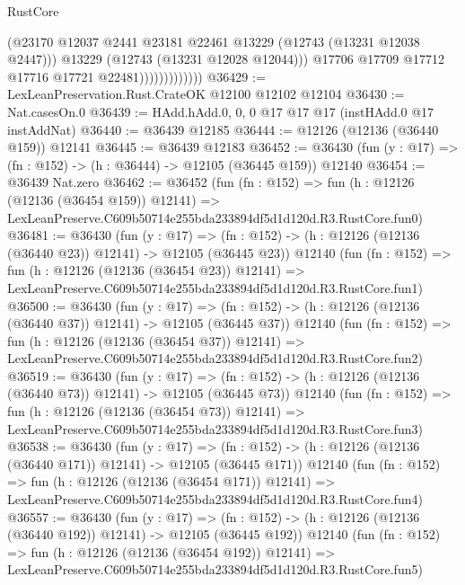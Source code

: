 \begin{lexlean}{RustCore}
\begin{coremodule}
                                (@23170
                                  @12037
                                  @2441
                                  @23181
                                  @22461
                                  @13229
                                  (@12743 (@13231 @12038 @2447)))
                                @13229
                                (@12743 (@13231 @12028 @12044)))
                              @17706
                              @17709
                              @17712
                              @17716
                              @17721
                              @22481)))))))))))))
@36429 := LexLeanPreservation.Rust.CrateOK @12100 @12102 @12104
@36430 := Nat.casesOn.{0}
@36439 := HAdd.hAdd.{0, 0, 0} @17 @17 @17 (instHAdd.{0} @17 instAddNat)
@36440 := @36439 @12185
@36444 := @12126 (@12136 (@36440 @159)) @12141
@36445 := @36439 @12183
@36452 := @36430 (fun (y : @17) => (fn : @152) -> (h : @36444) -> @12105 (@36445 @159)) @12140
@36454 := @36439 Nat.zero
@36462 := @36452
    (fun (fn : @152) =>
    fun (h : @12126 (@12136 (@36454 @159)) @12141) =>
    LexLeanPreserve.C609b50714e255bda233894df5d1d120d.R3.RustCore.fun0)
@36481 := @36430
    (fun (y : @17) =>
    (fn : @152) -> (h : @12126 (@12136 (@36440 @23)) @12141) -> @12105 (@36445 @23))
    @12140
    (fun (fn : @152) =>
    fun (h : @12126 (@12136 (@36454 @23)) @12141) =>
    LexLeanPreserve.C609b50714e255bda233894df5d1d120d.R3.RustCore.fun1)
@36500 := @36430
    (fun (y : @17) =>
    (fn : @152) -> (h : @12126 (@12136 (@36440 @37)) @12141) -> @12105 (@36445 @37))
    @12140
    (fun (fn : @152) =>
    fun (h : @12126 (@12136 (@36454 @37)) @12141) =>
    LexLeanPreserve.C609b50714e255bda233894df5d1d120d.R3.RustCore.fun2)
@36519 := @36430
    (fun (y : @17) =>
    (fn : @152) -> (h : @12126 (@12136 (@36440 @73)) @12141) -> @12105 (@36445 @73))
    @12140
    (fun (fn : @152) =>
    fun (h : @12126 (@12136 (@36454 @73)) @12141) =>
    LexLeanPreserve.C609b50714e255bda233894df5d1d120d.R3.RustCore.fun3)
@36538 := @36430
    (fun (y : @17) =>
    (fn : @152) -> (h : @12126 (@12136 (@36440 @171)) @12141) -> @12105 (@36445 @171))
    @12140
    (fun (fn : @152) =>
    fun (h : @12126 (@12136 (@36454 @171)) @12141) =>
    LexLeanPreserve.C609b50714e255bda233894df5d1d120d.R3.RustCore.fun4)
@36557 := @36430
    (fun (y : @17) =>
    (fn : @152) -> (h : @12126 (@12136 (@36440 @192)) @12141) -> @12105 (@36445 @192))
    @12140
    (fun (fn : @152) =>
    fun (h : @12126 (@12136 (@36454 @192)) @12141) =>
    LexLeanPreserve.C609b50714e255bda233894df5d1d120d.R3.RustCore.fun5)

\end{coremodule}
\end{lexlean}

